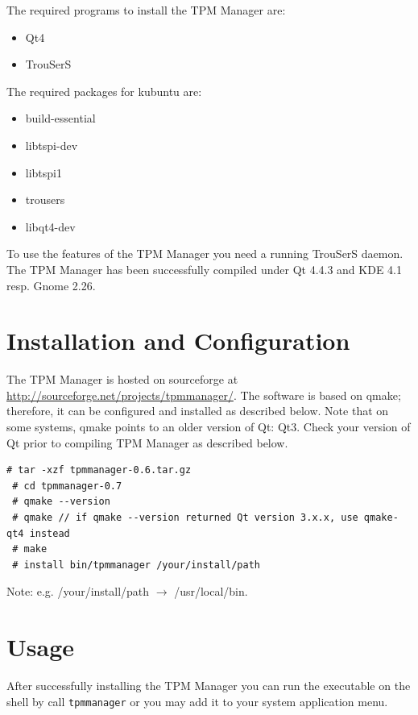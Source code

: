 \documentclass[
  american        %
]{sirrixreport}
\begin{document}
The required programs to install the TPM Manager are: 

\begin{itemize}
   \item Qt4
   \item TrouSerS
\end{itemize}

The required packages for kubuntu are:
\begin{itemize}
  \item build-essential
  \item libtspi-dev
  \item libtspi1
  \item trousers
  \item libqt4-dev
\end{itemize}

To use the features of the TPM Manager you need a running TrouSerS daemon.
The TPM Manager has been successfully compiled under Qt 4.4.3 and KDE 4.1 resp. Gnome 2.26.


\section{Installation and Configuration}
The TPM Manager is hosted on sourceforge at \url{http://sourceforge.net/projects/tpmmanager/}. The software is based on qmake; therefore, it can be configured and installed as described 
below. Note that on some systems, qmake points to an older version of Qt: Qt3. Check 
your version of Qt prior to compiling TPM Manager as described below. 

 \begin{lstlisting}[caption=Configuring and compiling the TPM Manager:, frame=lines]
 # tar -xzf tpmmanager-0.6.tar.gz 
 # cd tpmmanager-0.7 
 # qmake --version 
 # qmake // if qmake --version returned Qt version 3.x.x, use qmake-qt4 instead 
 # make
 # install bin/tpmmanager /your/install/path
 \end{lstlisting}  
Note: e.g. /your/install/path $\rightarrow$ /usr/local/bin.

\clearpage
\section{Usage}

After successfully installing the TPM Manager you can run the executable on the shell by call \texttt{tpmmanager} or you may add it to your system application menu. 
\end{document}
